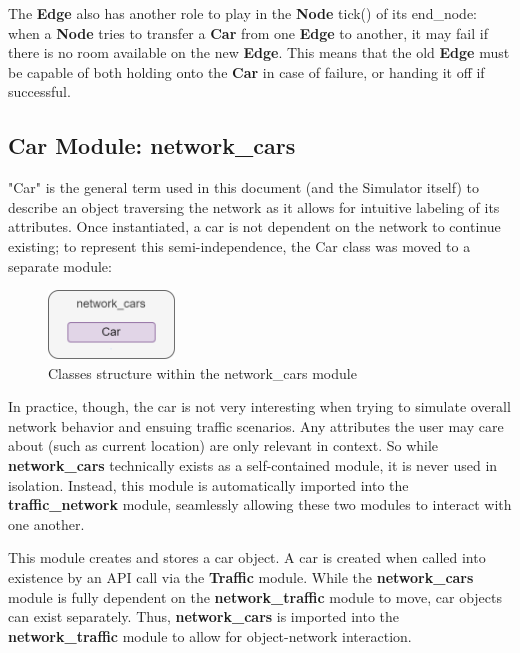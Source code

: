 \par The \textbf{Edge} also has another role to play in the \textbf{Node} tick() of its end\_node:  when a \textbf{Node} tries to transfer a \textbf{Car} from one \textbf{Edge} to another, it may fail if there is no room available on the new \textbf{Edge}.  This means that the old \textbf{Edge} must be capable of both holding onto the \textbf{Car} in case of failure, or handing it off if successful.\\


\subsection{Car Module:  network\_cars}

\par "Car" is the general term used in this document (and the Simulator itself) to describe an object traversing the network as it allows for intuitive labeling of its attributes.  Once instantiated, a car is not dependent on the network to continue existing; to represent this semi-independence, the Car class was moved to a separate module:

\begin{figure}[H]
    \centering
	\includegraphics[width=0.3\textwidth]{tex files/Figures/car_module.png}
	\caption[Car Module:  network\_cars]{Classes structure within the network\_cars module}
	\label{fig:cars_module}
\end{figure}

\par In practice, though, the car is not very interesting when trying to simulate overall network behavior and ensuing traffic scenarios.  Any attributes the user may care about (such as current location) are only relevant in context.  So while \textbf{network\_cars} technically exists as a self-contained module, it is never used in isolation.  Instead, this module is automatically imported into the \textbf{traffic\_network} module, seamlessly allowing these two modules to interact with one another.

\par This module creates and stores a car object.  A car is created when called into existence by an API call via the \textbf{Traffic} module.  While the \textbf{network\_cars} module is fully dependent on the \textbf{network\_traffic} module to move, car objects can exist separately.  Thus,  \textbf{network\_cars} is imported into the \textbf{network\_traffic} module to allow for object-network interaction. \\

